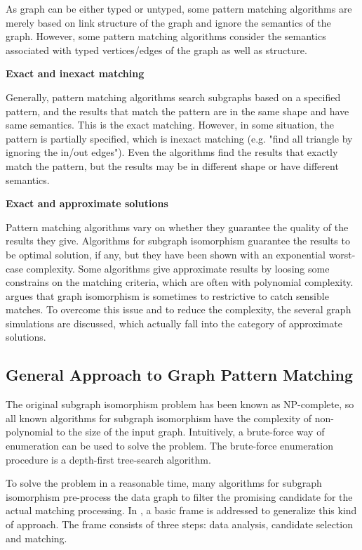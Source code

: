As graph can be either typed or untyped, some pattern matching algorithms are merely based on link structure of the graph and ignore the semantics of the graph. However, some pattern matching algorithms consider the semantics associated with typed vertices/edges of the graph as well as structure. 

\textbf{Exact and inexact matching}

Generally, pattern matching algorithms search subgraphs based on a specified pattern, and the results that match the pattern are in the same shape and have same semantics. This is the exact matching. However, in some situation, the pattern is partially specified, which is inexact matching (e.g. "find all triangle by ignoring the in/out edges"). Even the algorithms find the results that exactly match the pattern, but the results may be in different shape or have different semantics.

\textbf{Exact and approximate solutions}

Pattern matching algorithms vary on whether they guarantee the quality of the results they give. Algorithms for subgraph isomorphism guarantee the results to be optimal solution, if any, but they have been shown with an exponential worst-case complexity. Some algorithms give approximate results by loosing some constrains on the matching criteria, which are often with polynomial complexity. \cite{ma2011capturing} argues that graph isomorphism is sometimes to restrictive to catch sensible matches. To overcome this issue and to reduce the complexity, the several graph simulations are discussed, which actually fall into the category of approximate solutions.

\subsection{General Approach to Graph Pattern Matching}

The original subgraph isomorphism problem has been known as NP-complete\cite{gallagher2006matching}, so all known algorithms for subgraph isomorphism have the complexity of non-polynomial to the size of the input graph. Intuitively, a brute-force way of enumeration can be used to solve the problem. The brute-force enumeration procedure is a depth-first tree-search algorithm\cite{ullmann1976algorithm}.

To solve the problem in a reasonable time, many algorithms for subgraph isomorphism pre-process the data graph to filter the promising candidate for the actual matching processing. In \cite{giugno2002graphgrep, gallagher2006matching}, a basic frame is addressed to generalize this kind of approach. The frame consists of three steps: data analysis, candidate selection and matching. 

